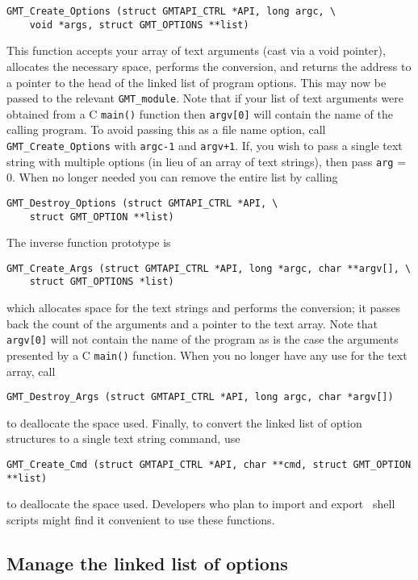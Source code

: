 \documentclass{report}
\begin{document}
\begin{verbatim}
GMT_Create_Options (struct GMTAPI_CTRL *API, long argc, \
    void *args, struct GMT_OPTIONS **list)
\end{verbatim}
This function accepts your array of text arguments (cast via a void pointer), allocates the necessary
space, performs the conversion, and returns the address to a pointer to the
head of the linked list of program options.  This may now be passed to the
relevant \texttt{GMT\_module}.  Note that if your list of text arguments
were obtained from a C \texttt{main()} function then \texttt{argv[0]} will
contain the name of the calling program.  To avoid passing this as a file
name option, call \texttt{GMT\_Create\_Options} with \texttt{argc-1}
and \texttt{argv+1}.  If, you wish to pass a single text string with
multiple options (in lieu of an array of text strings), then pass \texttt{arg} = 0.
When no longer needed you can remove the entire list by calling
\begin{verbatim}
GMT_Destroy_Options (struct GMTAPI_CTRL *API, \
    struct GMT_OPTION **list)
\end{verbatim}
The inverse function prototype is
\begin{verbatim}
GMT_Create_Args (struct GMTAPI_CTRL *API, long *argc, char **argv[], \
    struct GMT_OPTIONS *list)
\end{verbatim}
\index{GMT\_Create\_Args}
which allocates space for the text strings and performs the conversion;
it passes back the count of the arguments and a pointer to the text array.
Note that \texttt{argv[0]} will not contain the name of the program as
is the case the arguments presented by a C \texttt{main()} function.
When you no longer have any use for the text array, call
\begin{verbatim}
GMT_Destroy_Args (struct GMTAPI_CTRL *API, long argc, char *argv[])
\end{verbatim}
to deallocate the space used.
Finally, to convert the linked list of option structures to a single
text string command, use
\begin{verbatim}
GMT_Create_Cmd (struct GMTAPI_CTRL *API, char **cmd, struct GMT_OPTION **list)
\end{verbatim}
to deallocate the space used.
Developers who plan to import and export \GMT\ shell scripts might find it
convenient to use these functions.

\subsection{Manage the linked list of options}
\index{Linked options!Manage}
\end{document}
